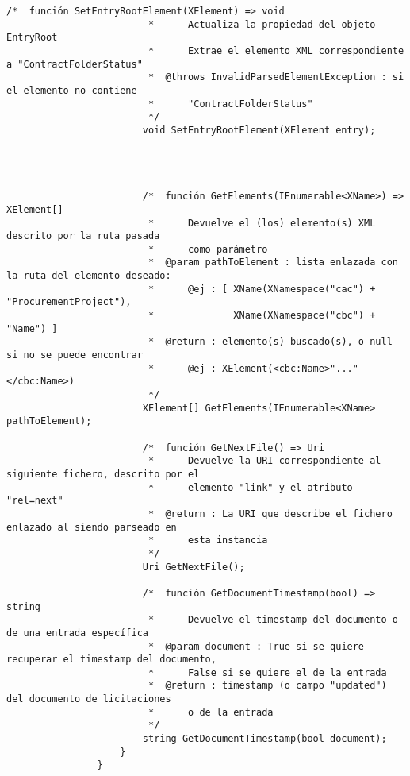 \begin{lstlisting}[language=lCSharp]
                        /*  función SetEntryRootElement(XElement) => void
                         *      Actualiza la propiedad del objeto EntryRoot
                         *      Extrae el elemento XML correspondiente a "ContractFolderStatus"
                         *  @throws InvalidParsedElementException : si el elemento no contiene 
                         *      "ContractFolderStatus"
                         */
                        void SetEntryRootElement(XElement entry);
                
                
                
                
                        /*  función GetElements(IEnumerable<XName>) => XElement[]
                         *      Devuelve el (los) elemento(s) XML descrito por la ruta pasada
                         *      como parámetro
                         *  @param pathToElement : lista enlazada con la ruta del elemento deseado:
                         *      @ej : [ XName(XNamespace("cac") + "ProcurementProject"),
                         *              XName(XNamespace("cbc") + "Name") ]
                         *  @return : elemento(s) buscado(s), o null si no se puede encontrar
                         *      @ej : XElement(<cbc:Name>"..."</cbc:Name>)
                         */
                        XElement[] GetElements(IEnumerable<XName> pathToElement);
                
                        /*  función GetNextFile() => Uri
                         *      Devuelve la URI correspondiente al siguiente fichero, descrito por el
                         *      elemento "link" y el atributo "rel=next"
                         *  @return : La URI que describe el fichero enlazado al siendo parseado en
                         *      esta instancia
                         */
                        Uri GetNextFile();
                
                        /*  función GetDocumentTimestamp(bool) => string
                         *      Devuelve el timestamp del documento o de una entrada específica
                         *  @param document : True si se quiere recuperar el timestamp del documento, 
                         *      False si se quiere el de la entrada
                         *  @return : timestamp (o campo "updated") del documento de licitaciones
                         *      o de la entrada
                         */
                        string GetDocumentTimestamp(bool document);
                    }
                }
            \end{lstlisting}
\newpage
